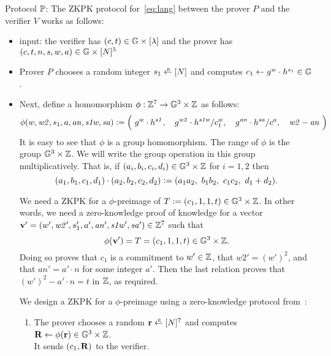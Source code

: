 \documentclass[11pt]{article}
\begin{document}
\medskip\noindent
Protocol $\mathbb{{P}}$: The ZKPK protocol for~\eqref{eq:lang} 
between the prover $P$ and the verifier $V$ works as follows:
\begin{itemize}
\item input:  the verifier has $(c, t) \in \mathbb G \times [{\lambda}]$ and 
the prover has $(c, t, n, s, w, a) \in \mathbb G \times [{N}]^5$  

\item Prover $P$ chooses a random integer $s_1 \rgets \range{N}$ and computes
       $c_1 \gets g^w \cdot h^{s_1} \in \mathbb G$. 

\item Next, define a homomorphism $\phi:\mathbb Z^7 \to \mathbb G^3 \times \mathbb Z$ as follows:
\begin{equation} \label{eq:hom}
  \phi(w, \mathit{w2}, s_1, a, \mathit{an}, \mathit{s1w}, \mathit{sa}) \deq
      \Bigl(\ 
       g^w \cdot h^{\mathit{s1}},\ \ \ 
       g^{\mathit{w2}} \cdot h^{\mathit{s1w}} / c_1^w,\ \ \ 
       g^{\mathit{an}} \cdot h^{\mathit{sa}} / c^a,\ \ \ 
       \mathit{w2} - \mathit{an}\ \Bigr)
\end{equation}
It is easy to see that $\phi$ is a group homomorphism.
The range of $\phi$ is the group $\mathbb G^3 \times \mathbb Z$.  
We will write the group operation in this group multiplicatively.
That is, if $(a_i, b_i, c_i, d_i) \in \mathbb G^3 \times \mathbb Z$ for $i=1,2$
then 
\[  (a_1, b_1, c_1, d_1) \cdot (a_2, b_2, c_2, d_2) \mathrel{\mathop:}= 
      (a_1 a_2,\ b_1 b_2,\ c_1 c_2,\ d_1 + d_2).  \]

We need a ZKPK for a $\phi$-preimage of 
$T \mathrel{\mathop:}= (c_1, 1, 1, t) \in \mathbb G^3 \times \mathbb Z$. 
In other words, we need a zero-knowledge proof of knowledge for a vector 
$\mathbf{v}' = (w', \mathit{w2}', s_1', a', \mathit{an}', 
              \mathit{s1w}', \mathit{sa}') \in \mathbb Z^7$ 
such that 
\[   \phi(\mathbf{v}') = T = (c_1, 1, 1, t) \in \mathbb G^3 \times \mathbb Z.  \]
Doing so proves 
that $c_1$ is a commitment to $w' \in \mathbb Z$, 
that $\mathit{w2}' = (w')^2$, and 
that $\mathit{an}' = a' \cdot n$ for some integer $a'$.
Then the last relation proves that $(w')^2 - a' \cdot n = t$ in $\mathbb Z$,
as required. 

We design a ZKPK for a $\phi$-preimage 
using a zero-knowledge protocol from~\cite[\S 3.5]{ourpaper}:
\begin{enumerate}
\item The prover chooses a random $\rv \rgets \range{N}^7$
and computes $\mathbf{R} \gets \phi(\mathbf{r}) \in \mathbb G^3 \times \mathbb Z$. \\
It sends $(c_1, \mathbf{R})$ to the verifier.


\end{enumerate}
\end{itemize}
\end{document}
